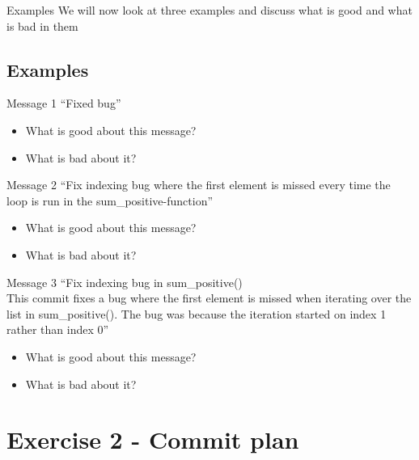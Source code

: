 \begin{frame}
\begin{block}{Examples}
    We will now look at three examples and discuss what is good and what is bad in them
\end{block}
\end{frame}

\subsection{Examples}
\begin{frame}
\begin{block}{Message 1}
    \enquote{Fixed bug}
\end{block}

\begin{question}
\begin{itemize}
    \pause
    \item What is good about this message?
    \pause
    \item What is bad about it?
\end{itemize}
\end{question}
    
\end{frame}

\begin{frame}
\begin{block}{Message 2}
    \enquote{Fix indexing bug where the first element is missed every time the loop is run in the sum\_positive-function}
\end{block}

\begin{question}
\begin{itemize}
    \pause
    \item What is good about this message?
    \pause
    \item What is bad about it?
\end{itemize}
\end{question}
    
\end{frame}


\begin{frame}
\begin{block}{Message 3}
    \enquote{Fix indexing bug in sum\_positive()\\ \vspace{10 pt} 
    This commit fixes a bug where the first element is missed when iterating over the list in sum\_positive(). The bug was because the iteration started on index 1 rather than index 0}
\end{block}

\begin{question}
\begin{itemize}
    \pause
    \item What is good about this message?
    \pause
    \item What is bad about it?
\end{itemize}
\end{question}
    
\end{frame}


\section{Exercise 2 - Commit plan}



